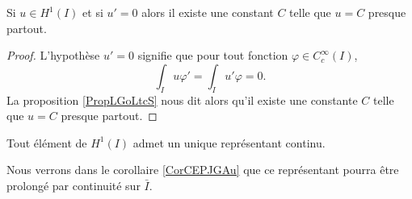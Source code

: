 \begin{corollary}   \label{CorEVJYihj}
    Si \( u\in H^1(I)\) et si \( u'=0\) alors il existe une constant \( C\) telle que \( u=C\) presque partout.
\end{corollary}

\begin{proof}
    L'hypothèse \( u'=0\) signifie que pour tout fonction \( \varphi\in C^{\infty}_c(I)\),
    \begin{equation}
        \int_Iu\varphi'=\int_Iu'\varphi=0.
    \end{equation}
    La proposition \ref{PropLGoLtcS} nous dit alors qu'il existe une constante \( C\) telle que \( u=C\) presque partout.
\end{proof}

\begin{lemma}   \label{LemMPkbZxX}
    Tout élément de \( H^1(I)\) admet un unique représentant continu.
\end{lemma}
Nous verrons dans le corollaire \ref{CorCEPJGAu} que ce représentant pourra être prolongé par continuité sur \( \bar I\).

